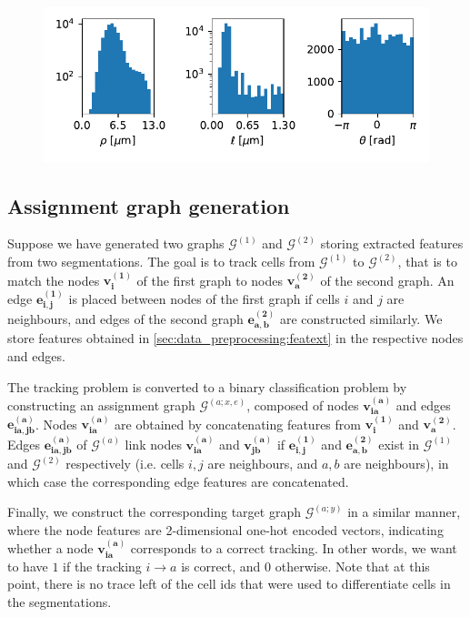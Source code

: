 \documentclass[10pt,conference,compsocconf,a4paper]{IEEEtran}
\newcommand{\G}{\mathcal{G}}
\renewcommand{\vec}[1]{\boldsymbol{#1}}
\newcommand*{\shortautoref}[1]{%
	\begingroup
	\def\equationautorefname{\textsc{Eq.}}%
	\def\tableautorefname{\textsc{Tab.}}%
	\def\figureautorefname{\textsc{Fig.}}%
	\autoref{#1}%
	\endgroup
}
\begin{document}
		\begin{figure}
			\centering
			\includegraphics[width=\linewidth]{figures/hist_e.pdf}
			\label{fig:hist_e}
		\end{figure}

	\subsection{Assignment graph generation}

		Suppose we have generated two graphs $\G^{(1)}$ and $\G^{(2)}$ storing extracted features from two segmentations. The goal is to track cells from $\G^{(1)}$ to $\G^{(2)}$, that is to match the nodes $\vec{v_i^{(1)}}$ of the first graph to nodes $\vec{v_a^{(2)}}$ of the second graph. An edge $\vec{e_{i,j}^{(1)}}$ is placed between nodes of the first graph if cells $i$ and $j$ are neighbours, and edges of the second graph $\vec{e_{a,b}^{(2)}}$ are constructed similarly. We store features obtained in \shortautoref{sec:data_preprocessing:featext} in the respective nodes and edges.
		
		The tracking problem is converted to a binary classification problem by constructing an assignment graph $\G^{(a;x,e)}$, composed of nodes $\vec{v_{ia}^{(a)}}$ and edges $\vec{e_{ia,jb}^{(a)}}$.
		Nodes $\vec{v_{ia}^{(a)}}$ are obtained by concatenating features from $\vec{v_i^{(1)}}$ and $\vec{v_a^{(2)}}$. Edges $\vec{e_{ia,jb}^{(a)}}$ of $\G^{(a)}$ link nodes $\vec{v_{ia}^{(a)}}$ and $\vec{v_{jb}^{(a)}}$ if $\vec{e_{i,j}^{(1)}}$ and $\vec{e_{a,b}^{(2)}}$ exist in $\G^{(1)}$ and $\G^{(2)}$ respectively (i.e. cells $i,j$ are neighbours, and $a,b$ are neighbours), in which case the corresponding edge features are concatenated.

		Finally, we construct the corresponding target graph $\G^{(a;y)}$ in a similar manner, where the node features are 2-dimensional one-hot encoded vectors, indicating whether a node $\vec{v_{ia}^{(a)}}$ corresponds to a correct tracking. In other words, we want to have $1$ if the tracking $i \rightarrow a$ is correct, and $0$ otherwise. Note that at this point, there is no trace left of the cell ids that were used to differentiate cells in the segmentations.
\end{document}
